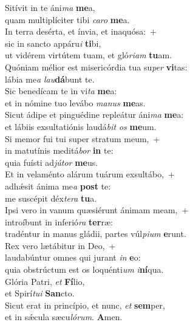 \evenverse Sitívit in te áni\textit{ma} \textbf{me}a,~\*\\
\evenverse quam multiplíciter tibi \textit{ca}\textit{ro} \textbf{me}a.\\
\oddverse In terra desérta, et ínvia, et inaquósa:~+\\
\oddverse  sic in sancto appáru\textit{i} \textbf{ti}bi,~\*\\
\oddverse ut vidérem virtútem tuam, et gló\textit{ri}\textit{am} \textbf{tu}am.\\
\evenverse Quóniam mélior est misericórdia tua su\textit{per} \textbf{vi}tas:~\*\\
\evenverse lábia me\textit{a} \textit{lau}\textbf{dá}bunt te.\\
\oddverse Sic benedícam te in vi\textit{ta} \textbf{me}a:~\*\\
\oddverse et in nómine tuo levábo \textit{ma}\textit{nus} \textbf{me}as.\\
\evenverse Sicut ádipe et pinguédine repleátur áni\textit{ma} \textbf{me}a:~\*\\
\evenverse et lábiis exsultatiónis laudá\textit{bit} \textit{os} \textbf{me}um.\\
\oddverse Si memor fui tui super stratum meum,~+\\
\oddverse  in matutínis meditá\textit{bor} \textbf{in} te:~\*\\
\oddverse quia fuísti ad\textit{jú}\textit{tor} \textbf{me}us.\\
\evenverse Et in velaménto alárum tuárum exsultábo,~+\\
\evenverse  adhǽsit ánima me\textit{a} \textbf{post} te:~\*\\
\evenverse me suscépit déx\textit{te}\textit{ra} \textbf{tu}a.\\
\oddverse Ipsi vero in vanum quæsiérunt ánimam meam,~+\\
\oddverse  introíbunt in inferió\textit{ra} \textbf{ter}ræ:~\*\\
\oddverse tradéntur in manus gládii, partes vúl\textit{pi}\textit{um} \textbf{e}runt.\\
\evenverse Rex vero lætábitur in Deo,~+\\
\evenverse  laudabúntur omnes qui jurant \textit{in} \textbf{e}o:~\*\\
\evenverse quia obstrúctum est os loquénti\textit{um} \textit{i}\textbf{ní}qua.\\
\oddverse Glória Patri, \textit{et} \textbf{Fí}lio,~\*\\
\oddverse et Spirí\textit{tu}\textit{i} \textbf{San}cto.\\
\evenverse Sicut erat in princípio, et nunc, \textit{et} \textbf{sem}per,~\*\\
\evenverse et in sǽcula sæcu\textit{ló}\textit{rum}. \textbf{A}men.\\
